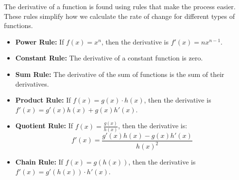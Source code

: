 The derivative of a function is found using rules that make the process easier. These rules simplify how we calculate the rate of change for different types of functions.

\begin{itemize}
    \item \textbf{Power Rule:} If \( f(x) = x^n \), then the derivative is \( f'(x) = nx^{n-1} \).
    \item \textbf{Constant Rule:} The derivative of a constant function is zero.
    \item \textbf{Sum Rule:} The derivative of the sum of functions is the sum of their derivatives.
    \item \textbf{Product Rule:} If \( f(x) = g(x) \cdot h(x) \), then the derivative is \( f'(x) = g'(x)h(x) + g(x)h'(x) \).
    \item \textbf{Quotient Rule:} If \( f(x) = \frac{g(x)}{h(x)} \), then the derivative is:
    \[
    f'(x) = \frac{g'(x)h(x) - g(x)h'(x)}{h(x)^2}
    \]
    \item \textbf{Chain Rule:} If \( f(x) = g(h(x)) \), then the derivative is \( f'(x) = g'(h(x)) \cdot h'(x) \).
\end{itemize}
